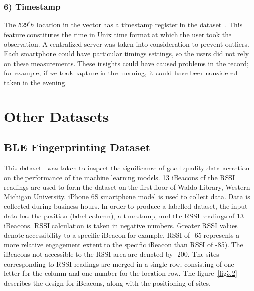 \documentclass[a4paper,singleside,12pt]{report} %
\begin{document}
				\subsubsection{6) Timestamp}

				The $529^th$ location in the vector has a timestamp register in the dataset~\cite{ujiindoor-data}. This feature constitutes the time in Unix time format at which the user took the observation. 
				A centralized server was taken into consideration to prevent outliers. 
				Each smartphone could have particular timings settings, so the users did not rely on these measurements. 
				These insights could have caused problems in the record; for example, if we took capture in the morning, it could have been considered taken in the evening.


\newpage

		\section{Other Datasets}
			\subsection{BLE Fingerprinting Dataset}

			This dataset~\cite{mohammadi2017semisupervised} was taken to inspect the significance of good quality data accretion on the performance of the machine learning models. 
			13 iBeacons of the RSSI readings are used to form the dataset on the first floor of Waldo Library, Western Michigan University. 
			iPhone 6S smartphone model is used to collect data. 
			Data is collected during business hours. In order to produce a labelled dataset, the input data has the position (label column), a timestamp, and the RSSI readings of 13 iBeacons. 
			RSSI calculation is taken in negative numbers. Greater RSSI values denote accessibility to a specific iBeacon for example, RSSI of -65 represents a more relative engagement extent to the specific iBeacon than RSSI of -85). 
			The iBeacons not accessible to the RSSI area are denoted by -200. The sites corresponding to RSSI readings are merged in a single row, consisting of one letter for the column and one number for the location row. 
			The figure~\ref{fig3.2} describes the design for iBeacons, along with the positioning of sites. 
\end{document}
